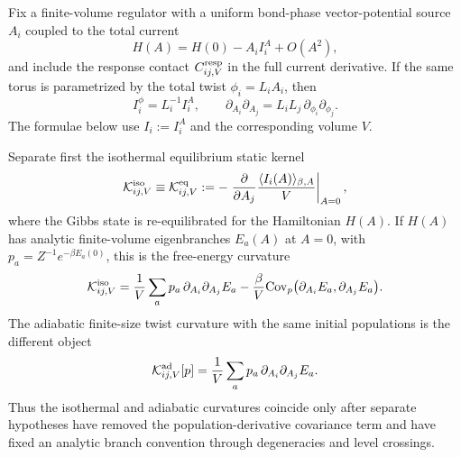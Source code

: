 \begin{proposition}
\label{prop:kubo-zero-mode-drude-normalization}
Fix a finite-volume regulator with a uniform bond-phase vector-potential source
\(A_i\) coupled to the total current
\[
  H(A)=H(0)-A_iI^A_i+O(A^2),
\]
and include the response contact \(C^{\rm resp}_{ij,V}\) in the full current
derivative.  If the same torus is parametrized by the total twist
\(\phi_i=L_iA_i\), then
\[
  I^\phi_i=L_i^{-1}I^A_i,\qquad
  \partial_{A_i}\partial_{A_j}
  =
  L_iL_j\,\partial_{\phi_i}\partial_{\phi_j}.
\]
The formulae below use \(I_i:=I_i^A\) and the corresponding volume \(V\).

Separate first the isothermal equilibrium static kernel
\begin{equation}
  \mathcal K^{\rm iso}_{ij,V}
  \equiv
  \mathcal K^{\rm eq}_{ij,V}
  :=
  -\left.
  \frac{\partial}{\partial A_j}
  \frac{\langle I_i(A)\rangle_{\beta,A}}{V}
  \right|_{A=0},
  \label{eq:kubo-equilibrium-static-conductivity-kernel}
\end{equation}
where the Gibbs state is re-equilibrated for the Hamiltonian \(H(A)\).  If
\(H(A)\) has analytic finite-volume eigenbranches \(E_a(A)\) at \(A=0\), with
\(p_a=Z^{-1}e^{-\beta E_a(0)}\), this is the free-energy curvature
\begin{equation}
  \mathcal K^{\rm iso}_{ij,V}
  =
  \frac1V\sum_a p_a\,\partial_{A_i}\partial_{A_j}E_a
  -
  \frac{\beta}{V}
  {\rm Cov}_p\bigl(\partial_{A_i}E_a,\partial_{A_j}E_a\bigr).
  \label{eq:kubo-isothermal-twist-curvature-spectral}
\end{equation}
The adiabatic finite-size twist curvature with the same initial populations is
the different object
\begin{equation}
  \mathcal K^{\rm ad}_{ij,V}[p]
  =
  \frac1V\sum_a p_a\,\partial_{A_i}\partial_{A_j}E_a .
  \label{eq:kubo-adiabatic-kohn-curvature-spectral}
\end{equation}
Thus the isothermal and adiabatic curvatures coincide only after separate
hypotheses have removed the population-derivative covariance term and have
fixed an analytic branch convention through degeneracies and level crossings.


\end{proposition}
